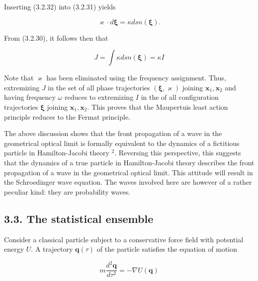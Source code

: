 \documentclass{article}
\begin{document}
Inserting (3.2.32) into (3.2.31) yields
 
\begin{equation*}
\varkappa \cdot d \boldsymbol{\xi}=\kappa d s n(\boldsymbol{\xi}) . \tag{3.2.33}
\end{equation*}
 

From (3.2.30), it follows then that
 
\begin{equation*}
J=\int \kappa d s n(\boldsymbol{\xi})=\kappa I \tag{3.2.34}
\end{equation*}
 

Note that $\boldsymbol{\varkappa}$ has been eliminated using the frequency assignment. Thus, extremizing $J$ in the set of all phase trajectories $(\boldsymbol{\xi}, \boldsymbol{\varkappa})$ joining $\boldsymbol{x}_{1}, \boldsymbol{x}_{2}$ and having frequency $\omega$ reduces to extremizing $I$ in the of all configuration trajectories $\boldsymbol{\xi}$ joining $\boldsymbol{x}_{1}, \boldsymbol{x}_{2}$. This proves that the Maupertuis least action principle reduces to the Fermat principle.

The above discussion shows that the front propagation of a wave in the geometrical optical limit is formally equivalent to the dynamics of a fictitious particle
in Hamilton-Jacobi theory ${ }^{2}$. Reversing this perspective, this suggests that the dynamics of a true particle in Hamilton-Jacobi theory describes the front propagation of a wave in the geometrical optical limit. This attitude will result in the Schroedinger wave equation. The waves involved here are however of a rather peculiar kind: they are probability waves.


\subsection*{3.3. The statistical ensemble}

Consider a classical particle subject to a conservative force field with potential energy $U$. A trajectory $\boldsymbol{q}(\tau)$ of the particle satisfies the equation of motion
 
\begin{equation*}
m \frac{d^{2} \boldsymbol{q}}{d \tau^{2}}=-\nabla U(\boldsymbol{q}) \tag{3.3.1}
\end{equation*}
 
\end{document}
